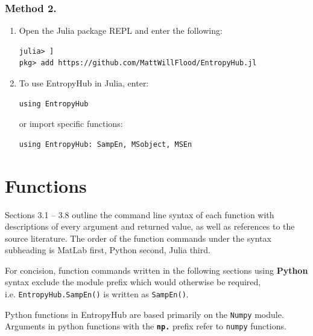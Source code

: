 \documentclass[12pt, a4paper, titlepage, openany]{book}
\newcommand\chapterimage[2][]{%
  \AddToShipoutPictureBG*{%
    \AtTextUpperLeft{%
     \hspace*{\textwidth}%
      \llap{%
            \texttt{[image: \#2]}}}}}%
\begin{document}
\subsection*{\normalsize Method 2.}
\begin{enumerate}
\item  Open the Julia package REPL and enter the following:
\begin{verbatim}
julia> ]
pkg> add https://github.com/MattWillFlood/EntropyHub.jl
\end{verbatim}
\item To use EntropyHub in Julia, enter:
\begin{verbatim}
using EntropyHub
\end{verbatim}
or import specific functions:
\begin{verbatim}
using EntropyHub: SampEn, MSobject, MSEn
\end{verbatim}
\end{enumerate}


\newpage
\chapter{\textbf{Functions}}
\chapterimage[width=16cm, height=3cm]{Chapter Banner2.png}
\vspace{55mm}

Sections 3.1 – 3.8 outline the command line syntax of each function with descriptions of every argument and returned value, as well as references to the source literature. The order of the function commands under the syntax subheading is MatLab first, Python second, Julia third. 

\begin{tcolorbox}[sharp corners, colback=ehone!30, colframe=ehone, title=\textbf{NOTE}]
For concision, function commands written in the following sections using \textbf{Python} syntax exclude the module prefix which would otherwise be required,\\ i.e. \texttt{EntropyHub.SampEn()} is written as \texttt{SampEn()}. 
\end{tcolorbox}

\begin{tcolorbox}[sharp corners, colback=ehone!30, colframe=ehone, title=\textbf{NOTE}]
Python functions in EntropyHub are based primarily on the \texttt{Numpy} module.\\ Arguments in python functions with the \textbf{\texttt{np.}} prefix refer to \texttt{numpy} functions.  
\end{tcolorbox}
\end{document}
